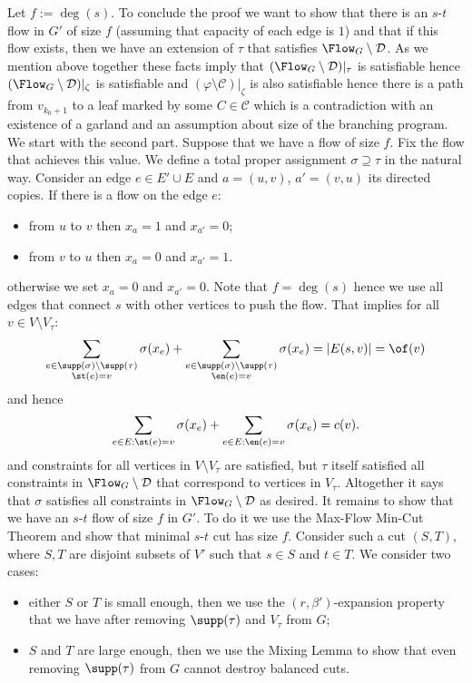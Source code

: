 Let $f:=\deg(s)$. To conclude the proof we want to show that there is an $s$-$t$ flow in $G'$ of size $f$ (assuming that capacity of each edge is $1$) and that if this flow exists, then we have an extension of $\tau$ that satisfies $\Flow_G\setminus\mathcal D$. As we mention above together these facts imply that $(\Flow_G\setminus\mathcal D)|_\tau$ is satisfiable hence $(\Flow_G\setminus\mathcal D)|_\zeta$ is satisfiable and $(\varphi\setminus\mathcal C)|_\zeta$ is also satisfiable hence there is a path from $v_{k_0+1}$ to a leaf marked by some $C\in\mathcal C$ which is a contradiction with an existence of a garland and an assumption about size of the branching program.
We start with the second part. Suppose that we have a flow of size $f$. Fix the flow that achieves this value. We define a total proper assignment $\sigma\supseteq\tau$ in the natural way. Consider an edge $e\in E'\cup E$ and $a=(u,v)$, $a'=(v,u)$ its directed copies. If there is a flow on the edge $e$:
\begin{itemize}\item from $u$ to $v$ then $x_a=1$ and $x_{a'}=0$;
\item from $v$ to $u$ then $x_a=0$ and $x_{a'}=1$.\end{itemize}
otherwise we set $x_a=0$ and $x_{a'}=0$.
Note that $f=\deg(s)$ hence we use all edges that connect $s$ with other vertices to push the flow. That implies for all $v\in V\setminus V_\tau$:
\[\sum_{\substack{e\in\supp(\sigma)\setminus\supp(\tau)\\\st(e)=v}}\sigma(x_e)+\sum_{\substack{e\in\supp(\sigma)\setminus\supp(\tau)\\\en(e)=v}}\sigma(x_e)=|E(s,v)|=\of(v)\]
and hence
\[\sum_{e\in E:\st(e)=v}\sigma(x_e)+\sum_{e\in E:\en(e)=v}\sigma(x_e)=c(v).\]
and constraints for all vertices in $V\setminus V_\tau$ are satisfied, but $\tau$ itself satisfied all constraints in $\Flow_G\setminus\mathcal D$ that correspond to vertices in $V_\tau$. Altogether it says that $\sigma$ satisfies all constraints in $\Flow_G\setminus\mathcal D$ as desired.
It remains to show that we have an $s$-$t$ flow of size $f$ in $G'$. To do it we use the Max-Flow Min-Cut Theorem and show that minimal $s$-$t$ cut has size $f$. Consider such a cut $(S,T)$, where $S,T$ are disjoint subsets of $V'$ such that $s\in S$ and $t\in T$. We consider two cases:
\begin{itemize}\item either $S$ or $T$ is small enough, then we use the $(r,\beta')$-expansion property that we have after removing $\supp(\tau)$ and $V_\tau$ from $G$;
\item $S$ and $T$ are large enough, then we use the Mixing Lemma to show that even removing $\supp(\tau)$ from $G$ cannot destroy balanced cuts.\end{itemize}
